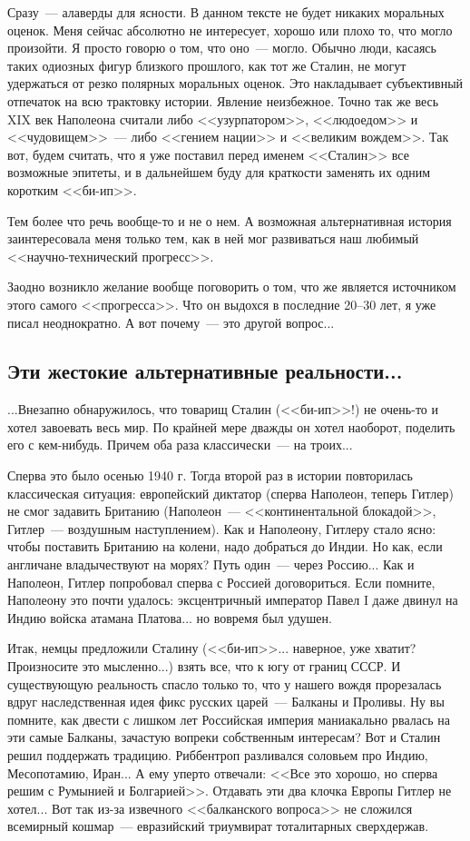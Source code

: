 \documentclass{scrbook}
\newcommand{\flqq}{<<}
\newcommand{\frqq}{>>}
\newcommand{\mdash}{~--- }
\newcommand{\ndash}{--}
\newcommand{\essaysection}[1]{\subsection*{#1}\nopagebreak}
\begin{document}
Сразу{\mdash}алаверды для ясности. В данном тексте не будет никаких моральных оценок. Меня сейчас абсолютно не интересует, хорошо или плохо то, что могло произойти. Я просто говорю о том, что оно{\mdash}могло. Обычно люди, касаясь таких одиозных фигур близкого прошлого, как тот же Сталин, не могут удержаться от резко полярных моральных оценок. Это накладывает субъективный отпечаток на всю трактовку истории. Явление неизбежное. Точно так же весь XIX век Наполеона считали либо {\flqq}узурпатором{\frqq}, {\flqq}людоедом{\frqq} и {\flqq}чудовищем{\frqq}{\mdash}либо {\flqq}гением нации{\frqq} и {\flqq}великим вождем{\frqq}. Так вот, будем считать, что я уже поставил перед именем {\flqq}Сталин{\frqq} все возможные эпитеты, и в дальнейшем буду для краткости заменять их одним коротким {\flqq}би-ип{\frqq}.

Тем более что речь вообще-то и не о нем. А возможная альтернативная история заинтересовала меня только тем, как в ней мог развиваться наш любимый {\flqq}научно-технический прогресс{\frqq}.

Заодно возникло желание вообще поговорить о том, что же является источником этого самого {\flqq}прогресса{\frqq}. Что он выдохся в последние 20{\ndash}30 лет, я уже писал неоднократно. А вот почему{\mdash}это другой вопрос...

\essaysection{Эти жестокие альтернативные реальности...}

...Внезапно обнаружилось, что товарищ Сталин ({\flqq}би-ип{\frqq}!) не очень-то и хотел завоевать весь мир. По крайней мере дважды он хотел наоборот, поделить его с кем-нибудь. Причем оба раза классически{\mdash}на троих...

Сперва это было осенью 1940 г. Тогда второй раз в истории повторилась классическая ситуация: европейский диктатор (сперва Наполеон, теперь Гитлер) не смог задавить Британию (Наполеон{\mdash}{\flqq}континентальной блокадой{\frqq}, Гитлер{\mdash}воздушным наступлением). Как и Наполеону, Гитлеру стало ясно: чтобы поставить Британию на колени, надо добраться до Индии. Но как, если англичане владычествуют на морях? Путь один{\mdash}через Россию... Как и Наполеон, Гитлер попробовал сперва с Россией договориться. Если помните, Наполеону это почти удалось: эксцентричный император Павел I даже двинул на Индию войска атамана Платова... но вовремя был удушен.

Итак, немцы предложили Сталину ({\flqq}би-ип{\frqq}... наверное, уже хватит? Произносите это мысленно...) взять все, что к югу от границ СССР. И существующую реальность спасло только то, что у нашего вождя прорезалась вдруг наследственная идея фикс русских царей{\mdash}Балканы и Проливы. Ну вы помните, как двести с лишком лет Российская империя маниакально рвалась на эти самые Балканы, зачастую вопреки собственным интересам? Вот и Сталин решил поддержать традицию. Риббентроп разливался соловьем про Индию, Месопотамию, Иран... А ему уперто отвечали: {\flqq}Все это хорошо, но сперва решим с Румынией и Болгарией{\frqq}. Отдавать эти два клочка Европы Гитлер не хотел... Вот так из-за извечного {\flqq}балканского вопроса{\frqq} не сложился всемирный кошмар{\mdash}евразийский триумвират тоталитарных сверхдержав.
\end{document}
